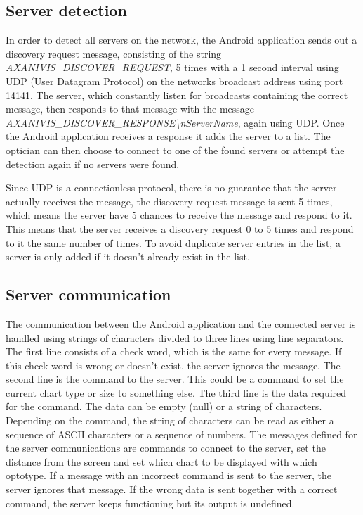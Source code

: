 \documentclass[12pt,a4paper,notitlepage]{report}
\begin{document}
\subsection{Server detection}
In order to detect all servers on the network, the Android application sends out a discovery request message, consisting of the string \\ \textit{AXANIVIS\_DISCOVER\_REQUEST}, 5 times with a 1 second interval using UDP (User Datagram Protocol) on the networks broadcast address using port 14141. The server, which constantly listen for broadcasts containing the correct message, then responds to that message with the message \textit{AXANIVIS\_DISCOVER\_RESPONSE\textbackslash nServerName}, again using UDP. Once the Android application receives a response it adds the server to a list. The optician can then choose to connect to one of the found servers or attempt the detection again if no servers were found.

Since UDP is a connectionless protocol, there is no guarantee that the server actually receives the message, the discovery request message is sent 5 times, which means the server have 5 chances to receive the message and respond to it. This means that the server receives a discovery request 0 to 5 times and respond to it the same number of times. To avoid duplicate server entries in the list, a server is only added if it doesn't already exist in the list.

\subsection{Server communication}
The communication between the Android application and the connected server is handled using strings of characters divided to three lines using line separators. The first line consists of a check word, which is the same for every message. If this check word is wrong or doesn't exist, the server ignores the message. The second line is the command to the server. This could be a command to set the current chart type or size to something else. The third line is the data required for the command. The data can be empty (null) or a string of characters. Depending on the command, the string of characters can be read as either a sequence of ASCII characters or a sequence of numbers. The messages defined for the server communications are commands to connect to the server, set the distance from the screen and set which chart to be displayed with which optotype. If a message with an incorrect command is sent to the server, the server ignores that message. If the wrong data is sent together with a correct command, the server keeps functioning but its output is undefined.
\end{document}
